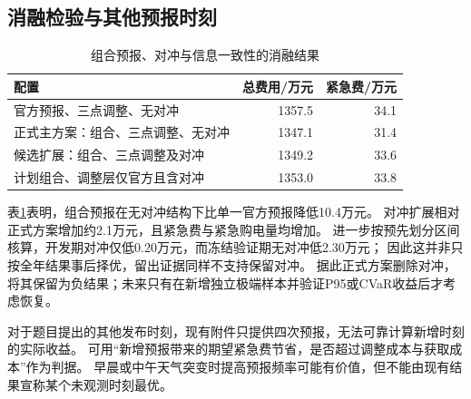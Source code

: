 \subsection{消融检验与其他预报时刻}
\begin{table}[htbp]\centering
\caption{组合预报、对冲与信息一致性的消融结果}\label{tab:ablation}
\begin{tabular}{lrr}
\toprule
配置 & 总费用/万元 & 紧急费/万元\\\midrule
官方预报、三点调整、无对冲 & 1357.5 & 34.1\\
正式主方案：组合、三点调整、无对冲 & 1347.1 & 31.4\\
候选扩展：组合、三点调整及对冲 & 1349.2 & 33.6\\
计划组合、调整层仅官方且含对冲 & 1353.0 & 33.8\\
\bottomrule
\end{tabular}
\end{table}
表\ref{tab:ablation}表明，组合预报在无对冲结构下比单一官方预报降低10.4万元。
对冲扩展相对正式方案增加约2.1万元，且紧急费与紧急购电量均增加。
进一步按预先划分区间核算，开发期对冲仅低0.20万元，而冻结验证期无对冲低2.30万元；
因此这并非只按全年结果事后择优，留出证据同样不支持保留对冲。
据此正式方案删除对冲，将其保留为负结果；未来只有在新增独立极端样本并验证P95或CVaR收益后才考虑恢复。

对于题目提出的其他发布时刻，现有附件只提供四次预报，无法可靠计算新增时刻的实际收益。
可用“新增预报带来的期望紧急费节省，是否超过调整成本与获取成本”作为判据。
早晨或中午天气突变时提高预报频率可能有价值，但不能由现有结果宣称某个未观测时刻最优。
